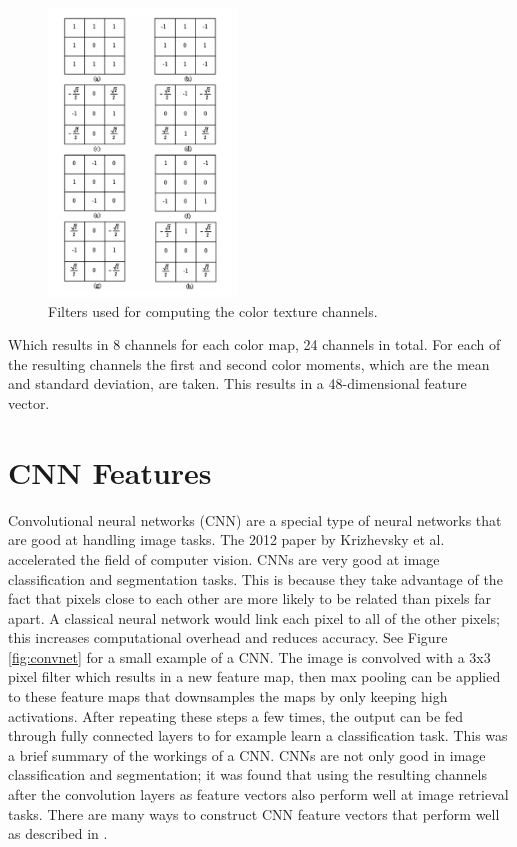 \documentclass{report}
\begin{document}
\begin{figure}[H]
	\includegraphics[width=5cm]{images/filters.png}
	\centering
	\caption{Filters used for computing the color texture channels.}
	\label{fig:filters}
\end{figure}

Which results in 8 channels for each color map, 24 channels in total. For each of the resulting channels the first and second color moments, which are the mean and standard deviation, are taken. This results in a 48-dimensional feature vector.

\section{CNN Features} \label{subsection:cnnfeatures}
Convolutional neural networks (CNN) are a special type of neural networks that are good at handling image tasks. The 2012 paper by Krizhevsky et al. \cite{krizhevsky2012imagenet} accelerated the field of computer vision. CNNs are very good at image classification and segmentation tasks. This is because they take advantage of the fact that pixels close to each other are more likely to be related than pixels far apart. A classical neural network would link each pixel to all of the other pixels; this increases computational overhead and reduces accuracy. See Figure \ref{fig:convnet} for a small example of a CNN. The image is convolved with a 3x3 pixel filter which results in a new feature map, then max pooling can be applied to these feature maps that downsamples the maps by only keeping high activations. After repeating these steps a few times, the output can be fed through fully connected layers to for example learn a classification task. This was a brief summary of the workings of a CNN. CNNs are not only good in image classification and segmentation; it was found that using the resulting channels after the convolution layers as feature vectors also perform well at image retrieval tasks. There are many ways to construct CNN feature vectors that perform well as described in \cite{zheng2018sift}.
\end{document}
